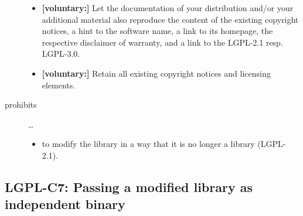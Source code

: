\begin{description}
\begin{itemize}
  \item \textbf{[voluntary:]} Let the documentation of your distribution and/or
  your additional material also reproduce the content of the existing
  copyright notices, a hint to the software name, a link to its homepage,
  the respective disclaimer of warranty, and a link to the LGPL-2.1 resp.
  LGPL-3.0.
  
  \item \textbf{[voluntary:]} Retain all existing copyright notices and
  licensing elements. 

\end{itemize}

\item[prohibits] \ldots
\begin{itemize}
  \item to modify the library in a way that it is no longer a library
  (LGPL-2.1).
\end{itemize}

\end{description}


\subsection{LGPL-C7: Passing a modified library as independent binary}
\label{OSUC-08B-LGPL}

